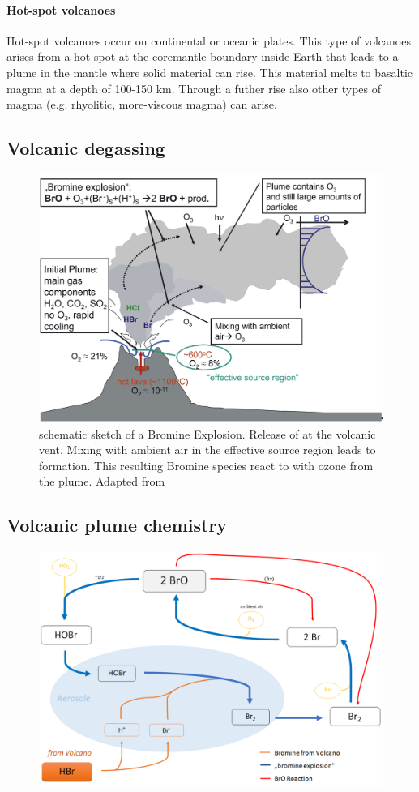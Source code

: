 \documentclass  [
  paper    = a4,
  BCOR     = 10mm,
  twoside,
  fontsize = 12pt,
  fleqn,
  toc      = bibnumbered,
  toc      = listofnumbered,
  numbers  = noendperiod,
  headings = normal,
  listof   = leveldown,
  version  = 3.03
]                                       {scrreprt}
\begin{document}
\paragraph{ Hot-spot volcanoes} Hot-spot volcanoes occur on continental or oceanic plates. This type of volcanoes arises from a hot spot at the coremantle boundary inside Earth that leads to a plume in the mantle where solid material can rise. This material melts to basaltic magma at a depth of 100-150 km. Through a futher rise also other types of magma (e.g. rhyolitic, more-viscous magma) can arise.

\subsection{Volcanic degassing}


\begin{figure}
	\centering
	\includegraphics[width=0.7\linewidth]{Bilder/Simon/Bilder_Tung/BrO_Plume}
	\caption{schematic sketch of a Bromine Explosion.
		Release of  at the volcanic vent. Mixing with ambient air in the effective source region leads to  formation. This resulting Bromine species react to  with ozone from the plume. Adapted from \cite{bobrowski2007reactive}}
	\label{fig:broplume}
\end{figure}

\subsection{Volcanic plume chemistry}
\begin{figure}
	\centering
	\includegraphics[width=0.7\linewidth]{Bilder/Simon/Bilder_Tung/BrO_Explosion}
	\caption{}
	\label{fig:broexplosion}
\end{figure}
\end{document}
